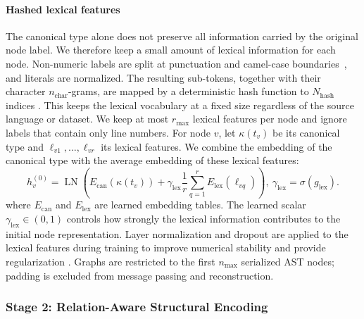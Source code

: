\documentclass[final,5p,times,twocolumn]{elsarticle}
\theoremstyle{plain}
\begin{document}
\paragraph{Hashed lexical features}
The canonical type alone does not preserve all information carried by the original node label. We therefore keep a small amount of lexical information for each node. Non-numeric labels are split at punctuation and camel-case boundaries~\cite{hill2014empirical}, and literals are normalized. The resulting sub-tokens, together with their character $n_{\mathrm{char}}$-grams, are mapped by a deterministic hash function to $N_{\mathrm{hash}}$ indices \cite{weinberger2009feature}. This keeps the lexical vocabulary at a fixed size regardless of the source language or dataset. We keep at most $r_{\max}$ lexical features per node and ignore labels that contain only line numbers. For node $v$, let $\kappa(t_v)$ be its canonical type and $\ell_{v1},\ldots,\ell_{vr}$ its lexical features. We combine the embedding of the canonical type with the average embedding of these lexical features:
\begin{equation}
h_v^{(0)}
=
\operatorname{LN}\!\left(
E_{\mathrm{can}}(\kappa(t_v))
+
\gamma_{\mathrm{lex}}
\frac{1}{r}
\sum_{q=1}^{r}
E_{\mathrm{lex}}(\ell_{vq})
\right),
\
\gamma_{\mathrm{lex}}=\sigma(g_{\mathrm{lex}}).
\label{eq:revised_node_initialization_old}
\end{equation}
where $E_{\mathrm{can}}$ and $E_{\mathrm{lex}}$ are learned embedding tables. The learned scalar $\gamma_{\mathrm{lex}}\in(0,1)$ controls how strongly the lexical information contributes to the initial node representation. Layer normalization and dropout are applied to the lexical features during
training to improve numerical stability and provide regularization
\cite{ba2016layer,srivastava2014dropout}. Graphs are restricted to the first $n_{\max}$ serialized AST nodes; padding is excluded from message passing and reconstruction.



\subsubsection{Stage 2: Relation-Aware Structural Encoding}
\label{sec:revised_relation_encoder}
\end{document}
